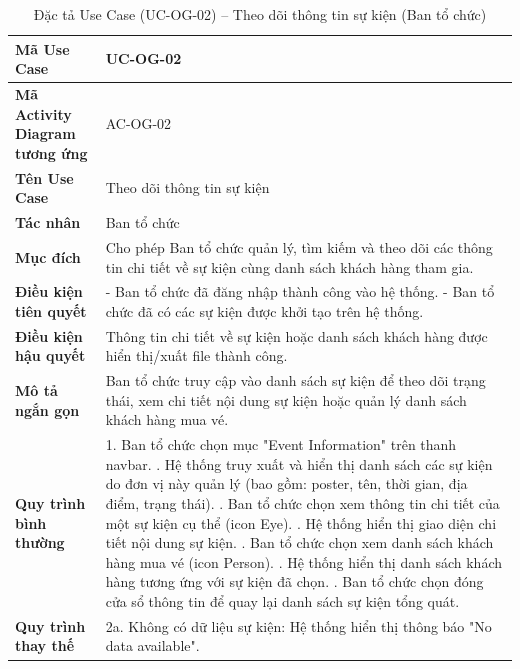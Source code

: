 \renewcommand{\arraystretch}{1.3}
\setlength{\tabcolsep}{4pt}
\begin{longtable}{|p{}|p{}|}
\caption{Đặc tả Use Case (UC-OG-02) -- Theo dõi thông tin sự kiện (Ban tổ chức)}\label{tab:uc_view_search_event}\\
\hline
\textbf{Mã Use Case} & UC-OG-02 \\ \hline
\textbf{Mã Activity Diagram tương ứng} & AC-OG-02 \\ \hline
\textbf{Tên Use Case} & Theo dõi thông tin sự kiện \\ \hline
\textbf{Tác nhân} & Ban tổ chức \\ \hline
\textbf{Mục đích} & 
Cho phép Ban tổ chức quản lý, tìm kiếm và theo dõi các thông tin chi tiết về sự kiện cùng danh sách khách hàng tham gia. \\ \hline
\textbf{Điều kiện tiên quyết} & 
- Ban tổ chức đã đăng nhập thành công vào hệ thống. \newline
- Ban tổ chức đã có các sự kiện được khởi tạo trên hệ thống. \\ \hline
\textbf{Điều kiện hậu quyết} & 
Thông tin chi tiết về sự kiện hoặc danh sách khách hàng được hiển thị/xuất file thành công. \\ \hline
\textbf{Mô tả ngắn gọn} & 
Ban tổ chức truy cập vào danh sách sự kiện để theo dõi trạng thái, xem chi tiết nội dung sự kiện hoặc quản lý danh sách khách hàng mua vé. \\ \hline
\textbf{Quy trình bình thường} &
1. Ban tổ chức chọn mục "Event Information" trên thanh navbar. \newline
2. Hệ thống truy xuất và hiển thị danh sách các sự kiện do đơn vị này quản lý (bao gồm: poster, tên, thời gian, địa điểm, trạng thái). \newline
3. Ban tổ chức chọn xem thông tin chi tiết của một sự kiện cụ thể (icon Eye). \newline
4. Hệ thống hiển thị giao diện chi tiết nội dung sự kiện. \newline
5. Ban tổ chức chọn xem danh sách khách hàng mua vé (icon Person). \newline
6. Hệ thống hiển thị danh sách khách hàng tương ứng với sự kiện đã chọn. \newline
7. Ban tổ chức chọn đóng cửa sổ thông tin để quay lại danh sách sự kiện tổng quát. \\ \hline
\textbf{Quy trình thay thế} &
2a. Không có dữ liệu sự kiện: Hệ thống hiển thị thông báo "No data available". \newline

\end{longtable}
